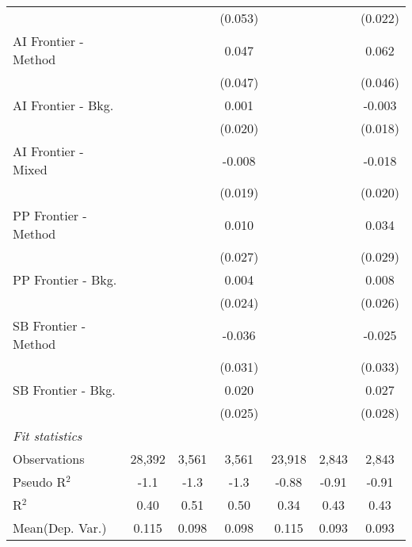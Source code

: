 \begin{tabular}{lcccccc}
                        &              &                & (0.053) &              &         & (0.022)\\   
   AI Frontier - Method &              &                & 0.047   &              &         & 0.062\\   
                        &              &                & (0.047) &              &         & (0.046)\\   
   AI Frontier - Bkg.   &              &                & 0.001   &              &         & -0.003\\   
                        &              &                & (0.020) &              &         & (0.018)\\   
   AI Frontier - Mixed  &              &                & -0.008  &              &         & -0.018\\   
                        &              &                & (0.019) &              &         & (0.020)\\   
   PP Frontier - Method &              &                & 0.010   &              &         & 0.034\\   
                        &              &                & (0.027) &              &         & (0.029)\\   
   PP Frontier - Bkg.   &              &                & 0.004   &              &         & 0.008\\   
                        &              &                & (0.024) &              &         & (0.026)\\   
   SB Frontier - Method &              &                & -0.036  &              &         & -0.025\\   
                        &              &                & (0.031) &              &         & (0.033)\\   
   SB Frontier - Bkg.   &              &                & 0.020   &              &         & 0.027\\   
                        &              &                & (0.025) &              &         & (0.028)\\   
   \midrule
   \emph{Fit statistics}\\
   Observations         & 28,392       & 3,561          & 3,561   & 23,918       & 2,843   & 2,843\\  
   Pseudo R$^2$         & -1.1         & -1.3           & -1.3    & -0.88        & -0.91   & -0.91\\  
   R$^2$                & 0.40         & 0.51           & 0.50    & 0.34         & 0.43    & 0.43\\  
Mean(Dep. Var.) & 0.115 & 0.098 & 0.098 & 0.115 & 0.093 & 0.093 \\
   

\end{tabular}

